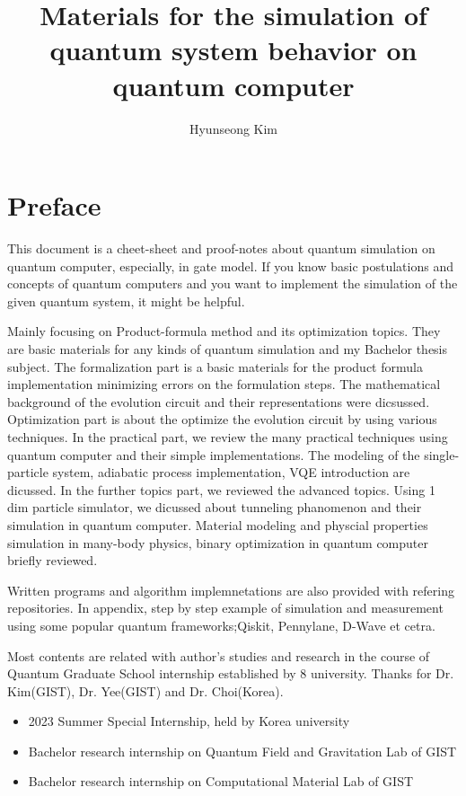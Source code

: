 \documentclass[10pt]{book}
\title{
    Materials for the simulation of quantum system behavior on quantum computer}
\author{Hyunseong Kim}
\begin{document}
\maketitle
\newpage
\pagestyle{fancynotes}

\section*{Preface}

This document is a cheet-sheet and proof-notes about 
quantum simulation on quantum computer, especially, in gate model.
If you know basic postulations and concepts of quantum computers and you want to implement the simulation
of the given quantum system, it might be helpful. 

Mainly focusing on Product-formula method and its optimization topics. 
They are basic materials for any kinds of quantum simulation and my Bachelor thesis subject.
The formalization part is a basic materials for the product formula implementation
minimizing errors on the formulation steps.
The mathematical background of the evolution circuit and their representations were dicsussed.
Optimization part is about the optimize the evolution circuit by using various techniques.
In the practical part, we review the many practical techniques using quantum 
computer and their simple implementations. 
The modeling of the single-particle system, adiabatic process implementation, 
VQE introduction are dicussed.
In the further topics part, we reviewed the advanced topics. 
Using 1 dim particle simulator, we dicussed about tunneling phanomenon and their 
simulation in quantum computer.
Material modeling and physcial properties simulation in many-body physics,
binary optimization in quantum computer briefly reviewed.

Written programs and algorithm implemnetations are also provided with refering repositories.
In appendix, step by step example of simulation and measurement 
using some popular quantum frameworks;Qiskit, Pennylane, D-Wave et cetra.


Most contents are related with author's studies and research in the course of Quantum Graduate School internship
established by 8 university. Thanks for Dr. Kim(GIST), Dr. Yee(GIST) and Dr. Choi(Korea).

\begin{itemize}
    \item 2023 Summer Special Internship, held by Korea university
    \item Bachelor research internship on Quantum Field and Gravitation Lab of GIST
    \item Bachelor research internship on Computational Material Lab of GIST
\end{itemize}
\end{document}
